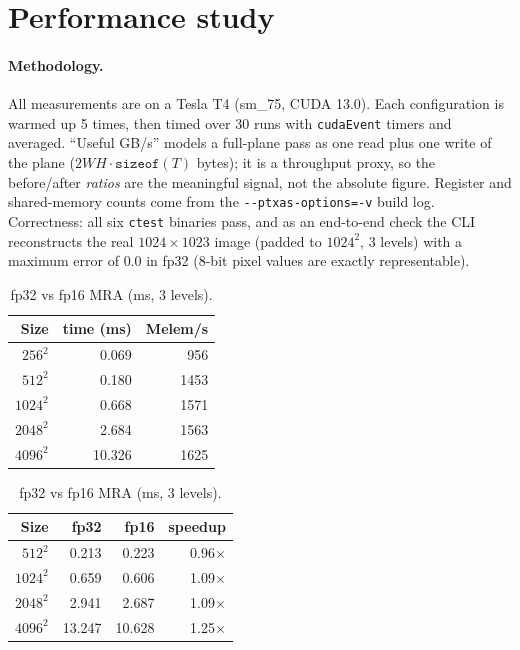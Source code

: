 \documentclass[11pt]{article}
\newcommand{\code}[1]{\texttt{#1}}
\begin{document}
\section{Performance study}
\label{sec:perf}

\paragraph{Methodology.}
All measurements are on a Tesla T4 (sm\_75, CUDA 13.0). Each configuration is
warmed up 5 times, then timed over 30 runs with \code{cudaEvent} timers and
averaged. ``Useful GB/s'' models a full-plane pass as one read plus one write of
the plane ($2WH\cdot\texttt{sizeof}(T)$ bytes); it is a throughput proxy, so the
before/after \emph{ratios} are the meaningful signal, not the absolute figure.
Register and shared-memory counts come from the \code{-{}-ptxas-options=-v} build
log. Correctness: all six \code{ctest} binaries pass, and as an end-to-end check
the CLI reconstructs the real $1024\times1023$ image (padded to $1024^2$, 3 levels)
with a maximum error of $0.0$ in fp32 (8-bit pixel values are exactly representable).

\begin{table}[h]
\centering\small
\begin{minipage}{0.48\textwidth}\centering
\begin{tabular}{@{}rrr@{}}
\toprule
Size & time (ms) & Melem/s \\
\midrule
$256^2$  & 0.069  & 956 \\
$512^2$  & 0.180  & 1453 \\
$1024^2$ & 0.668  & 1571 \\
$2048^2$ & 2.684  & 1563 \\
$4096^2$ & 10.326 & 1625 \\
\bottomrule
\end{tabular}
\caption{MRA forward throughput (fp32, 1 level).}
\label{tab:mra}
\end{minipage}\hfill
\begin{minipage}{0.48\textwidth}\centering
\begin{tabular}{@{}rrrr@{}}
\toprule
Size & fp32 & fp16 & speedup \\
\midrule
$512^2$  & 0.213  & 0.223  & 0.96$\times$ \\
$1024^2$ & 0.659  & 0.606  & 1.09$\times$ \\
$2048^2$ & 2.941  & 2.687  & 1.09$\times$ \\
$4096^2$ & 13.247 & 10.628 & 1.25$\times$ \\
\bottomrule
\end{tabular}
\caption{fp32 vs fp16 MRA (ms, 3 levels).}
\label{tab:fp16}
\end{minipage}
\end{table}
\end{document}
